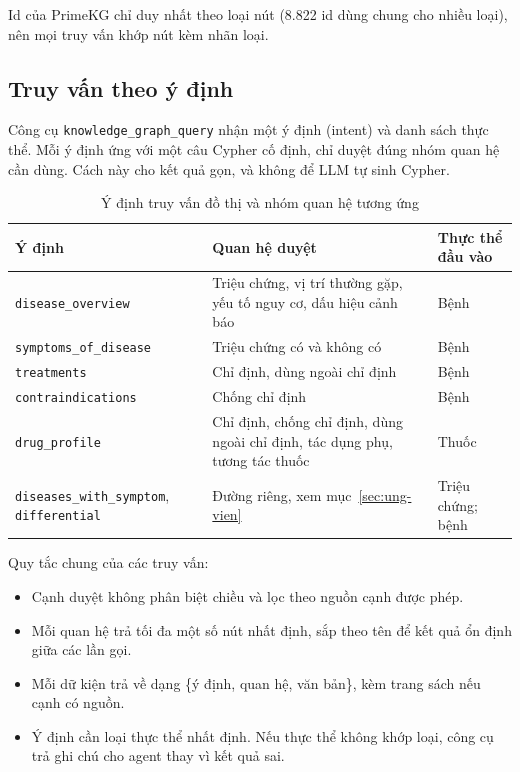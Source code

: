 Id của PrimeKG chỉ duy nhất theo loại nút (8.822 id dùng chung cho nhiều loại), nên mọi truy vấn khớp nút kèm nhãn loại.

\subsection{Truy vấn theo ý định}

Công cụ \texttt{knowledge\_graph\_query} nhận một ý định (intent) và danh sách thực thể. Mỗi ý định ứng với một câu Cypher cố định, chỉ duyệt đúng nhóm quan hệ cần dùng. Cách này cho kết quả gọn, và không để LLM tự sinh Cypher.

\begin{table}[H]
\centering
\small
\begin{tabular}{|p{4.2cm}|p{4.8cm}|p{3.9cm}|}
\hline
\textbf{Ý định} & \textbf{Quan hệ duyệt} & \textbf{Thực thể đầu vào} \\ \hline
\texttt{disease\_overview} & Triệu chứng, vị trí thường gặp, yếu tố nguy cơ, dấu hiệu cảnh báo & Bệnh \\ \hline
\texttt{symptoms\_of\_disease} & Triệu chứng có và không có & Bệnh \\ \hline
\texttt{treatments} & Chỉ định, dùng ngoài chỉ định & Bệnh \\ \hline
\texttt{contraindications} & Chống chỉ định & Bệnh \\ \hline
\texttt{drug\_profile} & Chỉ định, chống chỉ định, dùng ngoài chỉ định, tác dụng phụ, tương tác thuốc & Thuốc \\ \hline
\texttt{diseases\_with\_symptom}, \texttt{differential} & Đường riêng, xem mục~\ref{sec:ung-vien} & Triệu chứng; bệnh \\ \hline
\end{tabular}
\caption{Ý định truy vấn đồ thị và nhóm quan hệ tương ứng}
\label{tab:y-dinh-kg}
\end{table}

Quy tắc chung của các truy vấn:
\begin{itemize}
  \item Cạnh duyệt không phân biệt chiều và lọc theo nguồn cạnh được phép.
  \item Mỗi quan hệ trả tối đa một số nút nhất định, sắp theo tên để kết quả ổn định giữa các lần gọi.
  \item Mỗi dữ kiện trả về dạng \{ý định, quan hệ, văn bản\}, kèm trang sách nếu cạnh có nguồn.
  \item Ý định cần loại thực thể nhất định. Nếu thực thể không khớp loại, công cụ trả ghi chú cho agent thay vì kết quả sai.
\end{itemize}

